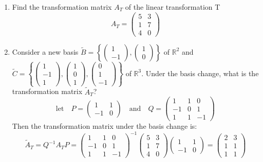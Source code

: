 \documentclass[a3paper,12pt]{extarticle} %
\begin{document}
\begin{enumerate}
\[    \]
    \begin{enumerate}
        \item Find the transformation matrix \(A_T\) of the linear transformation T
        \[
            A_T = \begin{pmatrix} 5 & 3 \\ 1 & 7 \\ 4 & 0 \end{pmatrix}
        \]
        \item Consider a new basis \(\tilde{B} = \left\{ \begin{pmatrix} 1 \\ -1 \end{pmatrix}, \begin{pmatrix} 1 \\ 0 \end{pmatrix} \right\}\) of \(\mathbb{R}^2\) and \(\tilde{C} = \left\{ \begin{pmatrix} 1 \\ -1 \\ 1 \end{pmatrix}, \begin{pmatrix} 1 \\ 0 \\ 1 \end{pmatrix}, \begin{pmatrix} 0 \\ 1 \\ -1 \end{pmatrix} \right\}\) of \(\mathbb{R}^3\). Under the basis change, what is the transformation matrix \(\tilde{A}_T\)?
        \[
            \text{let} \quad P = \begin{pmatrix} 1 & 1 \\ -1 & 0 \end{pmatrix} \quad \text{and} \quad Q = \begin{pmatrix} 1 & 1 & 0 \\ -1 & 0 & 1 \\ 1 & 1 & -1 \end{pmatrix}
        \]
        Then the transformation matrix under the basis change is:
        \[
            \tilde{A}_T = Q^{-1}A_TP = \begin{pmatrix} 1 & 1 & 0 \\ -1 & 0 & 1 \\ 1 & 1 & -1 \end{pmatrix}^{-1} \begin{pmatrix} 5 & 3 \\ 1 & 7 \\ 4 & 0 \end{pmatrix} \begin{pmatrix} 1 & 1 \\ -1 & 0 \end{pmatrix} = \begin{pmatrix} 2 & 3 \\ 1 & 1 \\ 1 & 1 \end{pmatrix}
\]
\end{enumerate}
\end{enumerate}
\end{document}
